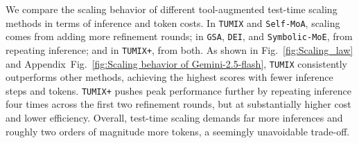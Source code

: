 We compare the scaling behavior of different tool-augmented test-time scaling methods in terms of inference and token costs. In \texttt{TUMIX} and \texttt{Self-MoA}, scaling comes from adding more refinement rounds; in \texttt{GSA}, \texttt{DEI}, and \texttt{Symbolic-MoE}, from repeating inference; and in \texttt{TUMIX+}, from both. As shown in Fig.~\ref{fig:Scaling_law} and Appendix~Fig.~\ref{fig:Scaling behavior of Gemini-2.5-flash}, \texttt{TUMIX} consistently outperforms other methods, achieving the highest scores with fewer inference steps and tokens. \texttt{TUMIX+} pushes peak performance further by repeating inference four times across the first two refinement rounds, but at substantially higher cost and lower efficiency. Overall, test-time scaling demands far more inferences and roughly two orders of magnitude more tokens, a seemingly unavoidable trade-off.